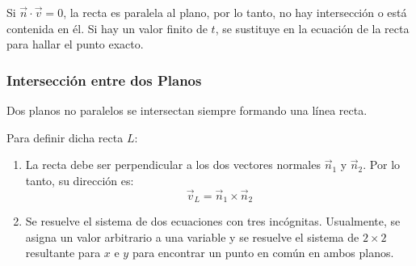 Si $\vec{n} \cdot \vec{v} = 0$, la recta es paralela al plano, por lo tanto, no hay intersección o está contenida en él. Si hay un valor finito de $t$, se sustituye en la ecuación de la recta para hallar el punto exacto.

\begin{center}
\shorthandoff{>}
\end{center}

\subsubsection{Intersección entre dos Planos}

Dos planos no paralelos se intersectan siempre formando una línea recta. 

Para definir dicha recta $L$:
\begin{enumerate}
    \item La recta debe ser perpendicular a los dos vectores normales $\vec{n}_1$ y $\vec{n}_2$. Por lo tanto, su dirección es:
    $$ \vec{v}_L = \vec{n}_1 \times \vec{n}_2 $$
    \item Se resuelve el sistema de dos ecuaciones con tres incógnitas. Usualmente, se asigna un valor arbitrario a una variable y se resuelve el sistema de $2 \times 2$ resultante para $x$ e $y$ para encontrar un punto en común en ambos planos.
\end{enumerate}

